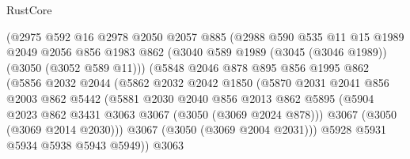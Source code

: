 \begin{lexlean}{RustCore}
\begin{coremodule}
                        (@2975
                          @592
                          @16
                          @2978
                          @2050
                          @2057
                          @885
                          (@2988
                            @590
                            @535
                            @11
                            @15
                            @1989
                            @2049
                            @2056
                            @856
                            @1983
                            @862
                            (@3040 @589 @1989 (@3045 (@3046 @1989)) (@3050 (@3052 @589 @11)))
                            (@5848
                              @2046
                              @878
                              @895
                              @856
                              @1995
                              @862
                              (@5856
                                @2032
                                @2044
                                (@5862
                                  @2032
                                  @2042
                                  @1850
                                  (@5870
                                    @2031
                                    @2041
                                    @856
                                    @2003
                                    @862
                                    @5442
                                    (@5881
                                      @2030
                                      @2040
                                      @856
                                      @2013
                                      @862
                                      @5895
                                      (@5904
                                        @2023
                                        @862
                                        @3431
                                        @3063
                                        @3067
                                        (@3050 (@3069 @2024 @878)))
                                      @3067
                                      (@3050 (@3069 @2014 @2030)))
                                    @3067
                                    (@3050 (@3069 @2004 @2031)))
                                  @5928
                                  @5931
                                  @5934
                                  @5938
                                  @5943
                                  @5949))
                              @3063

\end{coremodule}
\end{lexlean}
